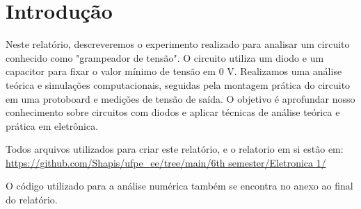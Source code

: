 \section{Introdução}

Neste relatório, descreveremos o experimento realizado para analisar um circuito conhecido como "grampeador de tensão". O circuito utiliza um diodo e um capacitor para fixar o valor mínimo de tensão em 0 V. Realizamos uma análise teórica e simulações computacionais, seguidas pela montagem prática do circuito em uma protoboard e medições de tensão de saída. O objetivo é aprofundar nosso conhecimento sobre circuitos com diodos e aplicar técnicas de análise teórica e prática em eletrônica.

Todos arquivos utilizados para criar este relatório, e o relatorio em si estão em:  \url{https://github.com/Shapis/ufpe_ee/tree/main/6th semester/Eletronica 1/}

O código utilizado para a análise numérica também se encontra no anexo ao final do relatório.